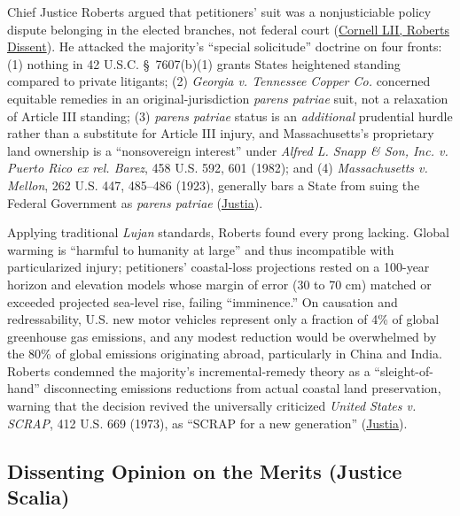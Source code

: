 \documentclass[12pt]{article}
\begin{document}
Chief Justice Roberts argued that petitioners' suit was a nonjusticiable policy dispute belonging in the elected branches, not federal court (\href{https://www.law.cornell.edu/supct/html/05-1120.ZD.html}{Cornell LII, Roberts Dissent}). He attacked the majority's ``special solicitude'' doctrine on four fronts: (1) nothing in 42 U.S.C. \S\ 7607(b)(1) grants States heightened standing compared to private litigants; (2) \textit{Georgia v. Tennessee Copper Co.} concerned equitable remedies in an original-jurisdiction \textit{parens patriae} suit, not a relaxation of Article III standing; (3) \textit{parens patriae} status is an \textit{additional} prudential hurdle rather than a substitute for Article III injury, and Massachusetts's proprietary land ownership is a ``nonsovereign interest'' under \textit{Alfred L. Snapp \& Son, Inc. v. Puerto Rico ex rel. Barez}, 458 U.S. 592, 601 (1982); and (4) \textit{Massachusetts v. Mellon}, 262 U.S. 447, 485--486 (1923), generally bars a State from suing the Federal Government as \textit{parens patriae} (\href{https://supreme.justia.com/cases/federal/us/549/497/}{Justia}).

Applying traditional \textit{Lujan} standards, Roberts found every prong lacking. Global warming is ``harmful to humanity at large'' and thus incompatible with particularized injury; petitioners' coastal-loss projections rested on a 100-year horizon and elevation models whose margin of error (30 to 70 cm) matched or exceeded projected sea-level rise, failing ``imminence.'' On causation and redressability, U.S. new motor vehicles represent only a fraction of 4\% of global greenhouse gas emissions, and any modest reduction would be overwhelmed by the 80\% of global emissions originating abroad, particularly in China and India. Roberts condemned the majority's incremental-remedy theory as a ``sleight-of-hand'' disconnecting emissions reductions from actual coastal land preservation, warning that the decision revived the universally criticized \textit{United States v. SCRAP}, 412 U.S. 669 (1973), as ``SCRAP for a new generation'' (\href{https://supreme.justia.com/cases/federal/us/549/497/}{Justia}).

\subsection{Dissenting Opinion on the Merits (Justice Scalia)}
\end{document}
